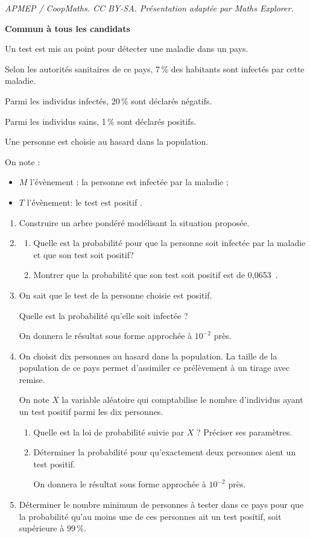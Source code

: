 \documentclass[10pt]{article}
\providecommand{\np}[2][]{{#2~#1}}
\begin{document}
\noindent\textit{APMEP / CoopMaths. CC BY-SA. Présentation adaptée par Maths Explorer.}\par\medskip
\textbf{Commun à tous les candidats}

\medskip

Un test est mis au point pour détecter une maladie dans un pays.

Selon les autorités sanitaires de ce pays, 7\,\% des habitants sont infectés par cette maladie. 

Parmi les individus infectés, 20\,\% sont déclarés négatifs.

Parmi les individus sains, 1\,\% sont déclarés positifs.

Une personne est choisie au hasard dans la population.

On note :

\setlength\parindent{9mm}
\begin{itemize}
\item[$\bullet~~$]$M$ l'évènement : \og la personne est infectée par la maladie\fg{} ;
\item[$\bullet~~$]$T$ l'évènement: \og le test est positif \fg.
\end{itemize}
\setlength\parindent{0mm}

\medskip

\begin{enumerate}
\item Construire un arbre pondéré modélisant la situation proposée.
\item 
	\begin{enumerate}
		\item Quelle est la probabilité pour que la personne soit infectée par la maladie et que son test soit positif?
		\item Montrer que la probabilité que son test soit positif est de \np{0,0653}.
	\end{enumerate}
\item On sait que le test de la personne choisie est positif. 

Quelle est la probabilité qu'elle soit infectée ?

On donnera le résultat sous forme approchée à $10^{-2}$ près.
\item On choisit dix personnes au hasard dans la population. La taille de la population de ce pays permet d'assimiler ce prélèvement à un tirage avec remise.

On note $X$ la variable aléatoire qui comptabilise le nombre d'individus ayant un test positif parmi les dix personnes.
	\begin{enumerate}
		\item Quelle est la loi de probabilité suivie par $X$ ? Préciser ses paramètres.
		\item Déterminer la probabilité pour qu'exactement deux personnes aient un test positif.

On donnera le résultat sous forme approchée à $10^{-2}$ près.
	\end{enumerate}
\item Déterminer le nombre minimum de personnes à tester dans ce pays pour que la probabilité qu'au moins une de ces personnes ait un test positif, soit supérieure à 99\,\%.
\end{enumerate}

\bigskip
\end{document}
